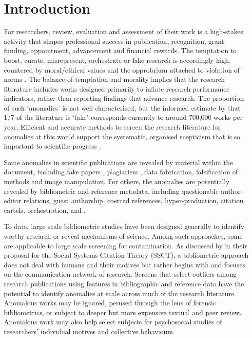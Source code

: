 \documentclass[10pt]{article}
\begin{document}
\section{Introduction}

For researchers, review, evaluation and assessment of their work is a high-stakes activity that shapes professional success in publication, recognition, grant funding, appointment, advancement and financial rewards. The temptation to boost, curate, misrepresent, orchestrate or fake research is accordingly high, countered by moral/ethical values and the opprobrium attached to violation of norms \cite{mertonSocialStructureScience1996}. The balance of temptation and morality implies that the research literature includes works designed primarily to inflate research performance indicators, rather than reporting findings that advance research. The proportion of such `anomalies' is not well characterised, but the informed estimate by \cite{jamesheathersApproximately172025} that 1/7 of the literature is `fake' corresponds currently to around 700,000 works per year. Efficient and accurate methods to screen the research literature for anomalies at this would support the systematic, organised scepticism that is so important to scientific progress \cite[Chapt. 9]{zimanRealScienceWhat2001}.

Some anomalies in scientific publications are revealed by material within the document, including fake papers \cite{elseFightFakepaperFactories2021}, plagiarism \cite{longRespondingPossiblePlagiarism2009}, data fabrication, falsification of methods and image manipulation. For others, the anomalies are potentially revealed by bibliometric and reference metadata, including questionable author-editor relations, guest authorship, coerced references, hyper-production, citation cartels, orchestration,  and .

To date, large scale bibliometric studies have been designed generally to identify worthy research or reveal mechanisms of science. Among such approaches, some are applicable to large scale screening for contamination. As discussed by \cite{tahamtanSocialSystemsCitation2022} in their proposal for the Social Systems Citation Theory (SSCT), a bibliometric approach does not deal with humans and their motives but rather begins with and focuses on the communication network of research. Screens that select outliers among research publications using features in bibliographic and reference data have the potential to identify anomalies at scale across much of the research literature. Anomalous works may be ignored, perused through the lens of forensic bibliometrics, or subject to deeper but more expensive textual and peer review. Anomalous work may also help select subjects for psychosocial studies of researchers' individual motives and collective behaviours.
\end{document}
